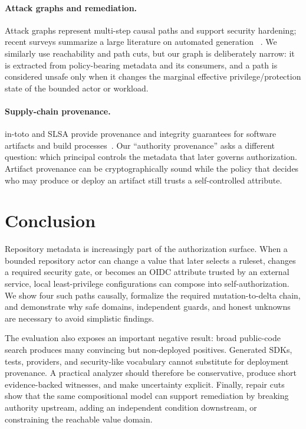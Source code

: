 \documentclass[sigconf,review,anonymous]{acmart}
\begin{document}
\paragraph{Attack graphs and remediation.}
Attack graphs represent multi-step causal paths and support security hardening;
recent surveys summarize a large literature on automated generation
~\cite{konsta2024attackgraphs}.  We similarly use reachability and path cuts, but
our graph is deliberately narrow: it is extracted from policy-bearing metadata
and its consumers, and a path is considered unsafe only when it changes the
marginal effective privilege/protection state of the bounded actor or workload.

\paragraph{Supply-chain provenance.}
in-toto and SLSA provide provenance and integrity guarantees for software
artifacts and build processes~\cite{torresarias2019intoto,slsa12}.  Our
``authority provenance'' asks a different question: which principal controls
the metadata that later governs authorization.  Artifact provenance can be
cryptographically sound while the policy that decides who may produce or deploy
an artifact still trusts a self-controlled attribute.

\section{Conclusion}

Repository metadata is increasingly part of the authorization surface.  When a
bounded repository actor can change a value that later selects a ruleset,
changes a required security gate, or becomes an OIDC attribute trusted by an
external service, local least-privilege configurations can compose into
self-authorization.  We show four such paths causally, formalize the required
mutation-to-delta chain, and demonstrate why safe domains, independent guards,
and honest unknowns are necessary to avoid simplistic findings.

The evaluation also exposes an important negative result: broad public-code
search produces many convincing but non-deployed positives.  Generated SDKs,
tests, providers, and security-like vocabulary cannot substitute for deployment
provenance.  A practical analyzer should therefore be conservative, produce
short evidence-backed witnesses, and make uncertainty explicit.  Finally,
repair cuts show that the same compositional model can support remediation by
breaking authority upstream, adding an independent condition downstream, or
constraining the reachable value domain.
\end{document}
